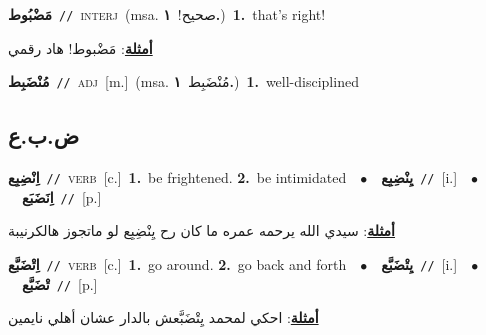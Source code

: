 \documentclass[10pt,a4paper,twoside]{article} %
\begin{document}
\begin{multicols}{2}
{{{{\setlength\topsep{0pt}\textbf{\foreignlanguage{arabic}{مَضْبُوط}}\ {\color{gray}\texttt{//}\color{black}}\ \textsc{interj}\ \color{gray}(msa. \foreignlanguage{arabic}{صحيح!}~\foreignlanguage{arabic}{\textbf{١.}})\color{black}\ \textbf{1.}~that's right!\  \begin{flushright}\color{gray}\foreignlanguage{arabic}{\textbf{\underline{\foreignlanguage{arabic}{أمثلة}}}: مَضْبوط! هاد رقمي}\end{flushright}\color{black}} \vspace{2mm}

{\setlength\topsep{0pt}\textbf{\foreignlanguage{arabic}{مُنْضَبِط}}\ {\color{gray}\texttt{//}\color{black}}\ \textsc{adj}\ [m.]\ \color{gray}(msa. \foreignlanguage{arabic}{مُنْضَبِط}~\foreignlanguage{arabic}{\textbf{١.}})\color{black}\ \textbf{1.}~well-disciplined\ 

\vspace{-3mm}
\subsection*{\color{blue}\foreignlanguage{arabic}{ض.ب.ع}\color{blue}{}} 

{\setlength\topsep{0pt}\textbf{\foreignlanguage{arabic}{اِنْضِبِع}}\ {\color{gray}\texttt{//}\color{black}}\ \textsc{verb}\ [c.]\ \textbf{1.}~be frightened.  \textbf{2.}~be intimidated\ \ $\bullet$\ \ \setlength\topsep{0pt}\textbf{\foreignlanguage{arabic}{يِنْضِبِع}}\ {\color{gray}\texttt{//}\color{black}}\ [i.]\ \ $\bullet$\ \ \setlength\topsep{0pt}\textbf{\foreignlanguage{arabic}{اِنَضَبَع}}\ {\color{gray}\texttt{//}\color{black}}\ [p.]\  \begin{flushright}\color{gray}\foreignlanguage{arabic}{\textbf{\underline{\foreignlanguage{arabic}{أمثلة}}}: سيدي الله يرحمه عمره ما كان رح يِنْضِبِع لو ماتجوز هالكرنيبة}\end{flushright}\color{black}} \vspace{2mm}

{\setlength\topsep{0pt}\textbf{\foreignlanguage{arabic}{اِتْضَبَّع}}\ {\color{gray}\texttt{//}\color{black}}\ \textsc{verb}\ [c.]\ \textbf{1.}~go around.  \textbf{2.}~go back and forth\ \ $\bullet$\ \ \setlength\topsep{0pt}\textbf{\foreignlanguage{arabic}{يِتْضَبَّع}}\ {\color{gray}\texttt{//}\color{black}}\ [i.]\ \ $\bullet$\ \ \setlength\topsep{0pt}\textbf{\foreignlanguage{arabic}{تْضَبَّع}}\ {\color{gray}\texttt{//}\color{black}}\ [p.]\  \begin{flushright}\color{gray}\foreignlanguage{arabic}{\textbf{\underline{\foreignlanguage{arabic}{أمثلة}}}: احكي لمحمد يِتْضَبَّعش بالدار عشان أهلي نايمين}\end{flushright}\color{black}} \vspace{2mm}

}}}}
\end{multicols}
\end{document}
